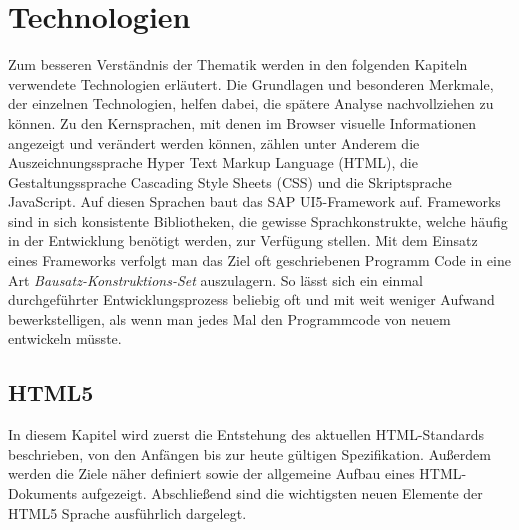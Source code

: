 \section{Technologien}\label{technologien}
Zum besseren Verständnis der Thematik werden in den folgenden Kapiteln verwendete Technologien erläutert. Die Grundlagen und besonderen Merkmale, der einzelnen Technologien, helfen dabei, die spätere Analyse nachvollziehen zu können. Zu den Kernsprachen, mit denen im Browser visuelle Informationen angezeigt und verändert werden können, zählen unter Anderem die Auszeichnungssprache Hyper Text Markup Language (HTML), die Gestaltungssprache Cascading Style Sheets (CSS) und die Skriptsprache JavaScript. Auf diesen Sprachen baut das SAP UI5-Framework auf. Frameworks sind in sich konsistente Bibliotheken, die gewisse Sprachkonstrukte, welche häufig in der Entwicklung benötigt werden, zur Verfügung stellen. Mit dem Einsatz eines Frameworks verfolgt man das Ziel oft geschriebenen Programm Code in eine Art \textit{Bausatz-Konstruktions-Set} auszulagern. So lässt sich ein einmal durchgeführter Entwicklungsprozess beliebig oft und mit weit weniger Aufwand bewerkstelligen, als wenn man jedes Mal den Programmcode von neuem entwickeln müsste.

\subsection{HTML5}
In diesem Kapitel wird zuerst die Entstehung des aktuellen HTML-Standards beschrieben, von den Anfängen bis zur heute gültigen Spezifikation. Außerdem werden die Ziele näher definiert sowie der allgemeine Aufbau eines HTML-Dokuments aufgezeigt. Abschließend sind die wichtigsten neuen Elemente der HTML5 Sprache ausführlich dargelegt.


